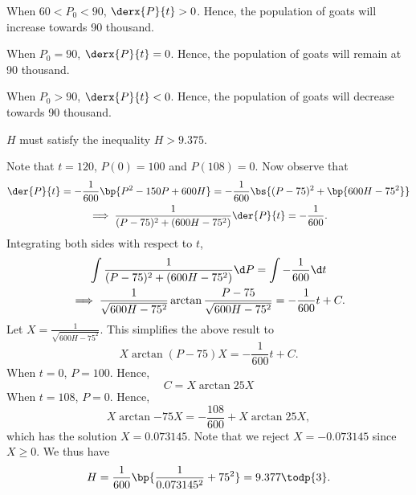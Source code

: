 \begin{solution}
\begin{ppart}
        When $60 < P_0 < 90$, $\derx{P}{t} > 0$. Hence, the population of goats will increase towards 90 thousand.

        When $P_0 = 90$, $\derx{P}{t} = 0$. Hence, the population of goats will remain at 90 thousand.

        When $P_0 > 90$, $\derx{P}{t} < 0$. Hence, the population of goats will decrease towards 90 thousand.
    \end{ppart}
    \begin{ppart}
        $H$ must satisfy the inequality $H > 9.375$.
    \end{ppart}
    \begin{ppart}
        Note that $t = 120$, $P(0) = 100$ and $P(108) = 0$. Now observe that
        \begin{gather*}
            \der{P}{t} = -\frac1{600} \bp{P^2 - 150P + 600H} = -\frac1{600} \bs{(P-75)^2 + \bp{600H - 75^2}} \\
            \implies \frac1{(P-75)^2 + (600H - 75^2)} \der{P}{t} = -\frac1{600}.
        \end{gather*}
        Integrating both sides with respect to $t$,
        \begin{gather*}
            \int \frac1{(P-75)^2 + (600H - 75^2)} \d P = \int -\frac1{600} \d t\\
            \implies \frac1{\sqrt{600H - 75^2}} \arctan{\frac{P-75}{\sqrt{600H - 75^2}}} = -\frac1{600} t + C.
        \end{gather*}
        Let $X = \frac{1}{\sqrt{600H - 75^2}}$. This simplifies the above result to \[X \arctan{(P-75)X} = -\frac1{600}t + C.\] When $t = 0$, $P = 100$. Hence, \[C = X \arctan{25X}\]
        When $t = 108$, $P = 0$. Hence, \[X\arctan{-75X} = -\frac{108}{600} + X \arctan{25X},\] which has the solution $X = 0.073145$. Note that we reject $X = -0.073145$ since $X \geq 0$. We thus have \[H = \frac1{600}\bp{\frac1{0.073145^2} + 75^2} = 9.377 \todp{3}.\]
    \end{ppart}
\end{solution}